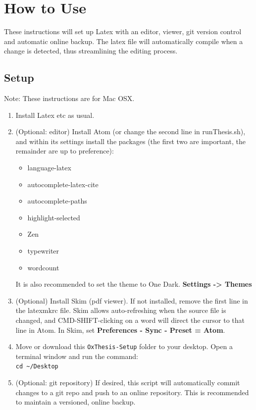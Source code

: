 
\chapter{How to Use}\label{ch:use}


These instructions will set up Latex with an editor, viewer, git version control and automatic online backup. The latex file will automatically compile when a change is detected, thus streamlining the editing process.

\section{Setup}
Note: These instructions are for Mac OSX.
\begin{enumerate}
  \item Install Latex etc as usual.
  \item (Optional: editor) Install Atom (or change the second line in runThesis.sh), and within its settings install the packages (the first two are important, the remainder are up to preference):
  \begin{itemize}
    \item language-latex
    \item autocomplete-latex-cite
    \item autocomplete-paths
    \item highlight-selected
    \item Zen
    \item typewriter
    \item wordcount
  \end{itemize}
  It is also recommended to set the theme to One Dark. \textbf{Settings -> Themes}
  \item (Optional) Install Skim (pdf viewer). If not installed, remove the first line in the latexmkrc file. Skim allows auto-refreshing when the source file is changed, and CMD-SHIFT-clicking on a word will direct the cursor to that line in Atom. In Skim, set \textbf{Preferences - Sync - Preset = Atom}.
  \item Move or download this \texttt{OxThesis-Setup} folder to your desktop. Open a terminal window and run the command:\\
  \texttt{cd \textasciitilde{}/Desktop}
  \item (Optional: git repository) If desired, this script will automatically commit changes to a git repo and push to an online repository. This is recommended to maintain a versioned, online backup.

\end{enumerate}
